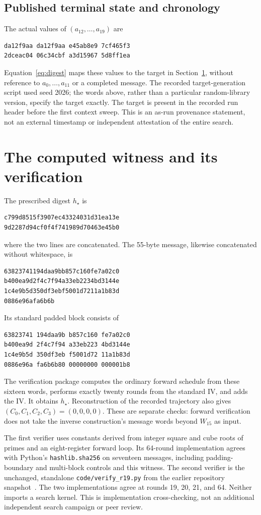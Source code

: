 \documentclass[11pt,a4paper]{article}
\newcommand{\hex}[1]{\texttt{#1}}
\begin{document}
\subsection{Published terminal state and chronology}
The actual values of $(a_{12},\ldots,a_{19})$ are
\begin{Verbatim}[fontsize=\small]
da12f9aa da12f9aa e45ab8e9 7cf465f3
2dceac04 06c34cbf a3d15967 5d8ff1ea
\end{Verbatim}
Equation~\eqref{eq:digest} maps these values to the target in Section~\ref{sec:witness}, without reference to $a_0,\ldots,a_{11}$ or a completed message. The recorded target-generation script used seed 2026; the words above, rather than a particular random-library version, specify the target exactly. The target is present in the recorded run header before the first context sweep. This is an as-run provenance statement, not an external timestamp or independent attestation of the entire search.

\section{The computed witness and its verification}
\label{sec:witness}
The prescribed digest $h_\star$ is
\begin{Verbatim}[fontsize=\small]
c799d8515f3907ec43324031d31ea13e
9d2287d94cf0f4f741989d70463e45b0
\end{Verbatim}
where the two lines are concatenated. The 55-byte message, likewise concatenated without whitespace, is
\begin{Verbatim}[fontsize=\small]
63823741194daa9bb857c160fe7a02c0
b400ea9d2f4c7f94a33eb2234bd3144e
1c4e9b5d350df3ebf5001d7211a1b83d
0886e96afa6b6b
\end{Verbatim}
Its standard padded block consists of
\begin{Verbatim}[fontsize=\small]
63823741 194daa9b b857c160 fe7a02c0
b400ea9d 2f4c7f94 a33eb223 4bd3144e
1c4e9b5d 350df3eb f5001d72 11a1b83d
0886e96a fa6b6b80 00000000 000001b8
\end{Verbatim}
The verification package computes the ordinary forward schedule from these sixteen words, performs exactly twenty rounds from the standard IV, and adds the IV. It obtains $h_\star$. Reconstruction of the recorded trajectory also gives $(C_0,C_1,C_2,C_3)=(0,0,0,0)$. These are separate checks: forward verification does not take the inverse construction's message words beyond $W_{15}$ as input.

The first verifier uses constants derived from integer square and cube roots of primes and an eight-register forward loop. Its 64-round implementation agrees with Python's \hex{hashlib.sha256} on seventeen messages, including padding-boundary and multi-block controls and this witness. The second verifier is the unchanged, standalone \hex{code/verify\_r19.py} from the earlier repository snapshot~\cite{basra}. The two implementations agree at rounds 19, 20, 21, and 64. Neither imports a search kernel. This is implementation cross-checking, not an additional independent search campaign or peer review.
\end{document}

